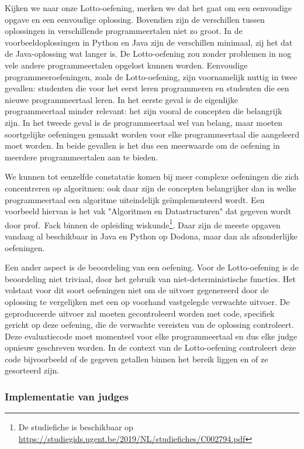 Kijken we naar onze Lotto-oefening, merken we dat het gaat om een eenvoudige opgave en een eenvoudige oplossing.
Bovendien zijn de verschillen tussen oplossingen in verschillende programmeertalen niet zo groot.
In de voorbeeldoplossingen in Python en Java zijn de verschillen minimaal, zij het dat de Java-oplossing wat langer is.
De Lotto-oefening zou zonder problemen in nog vele andere programmeertalen opgelost kunnen worden.
Eenvoudige programmeeroefeningen, zoals de Lotto-oefening, zijn voornamelijk nuttig in twee gevallen: studenten die voor het eerst leren programmeren en studenten die een nieuwe programmeertaal leren.
In het eerste geval is de eigenlijke programmeertaal minder relevant: het zijn vooral de concepten die belangrijk zijn.
In het tweede geval is de programmeertaal wel van belang, maar moeten soortgelijke oefeningen gemaakt worden voor elke programmeertaal die aangeleerd moet worden.
In beide gevallen is het dus een meerwaarde om de oefening in meerdere programmeertalen aan te bieden.

We kunnen tot eenzelfde constatatie komen bij meer complexe oefeningen die zich concentreren op algoritmen: ook daar zijn de concepten belangrijker dan in welke programmeertaal een algoritme uiteindelijk geïmplementeerd wordt.
Een voorbeeld hiervan is het vak "Algoritmen en Datastructuren" dat gegeven wordt door prof.\ Fack binnen de opleiding wiskunde\footnote{De studiefiche is beschikbaar op \url{https://studiegids.ugent.be/2019/NL/studiefiches/C002794.pdf}}.
Daar zijn de meeste opgaven vandaag al beschikbaar in Java en Python op Dodona, maar dan als afzonderlijke oefeningen.

Een ander aspect is de beoordeling van een oefening.
Voor de Lotto-oefening is de beoordeling niet triviaal, door het gebruik van niet-deterministische functies.
Het volstaat voor dit soort oefeningen niet om de uitvoer gegenereerd door de oplossing te vergelijken met een op voorhand vastgelegde verwachte uitvoer.
De geproduceerde uitvoer zal moeten gecontroleerd worden met code, specifiek gericht op deze oefening, die de verwachte vereisten van de oplossing controleert.
Deze evaluatiecode moet momenteel voor elke programmeertaal en dus elke judge opnieuw geschreven worden.
In de context van de Lotto-oefening controleert deze code bijvoorbeeld of de gegeven getallen binnen het bereik liggen en of ze gesorteerd zijn.

\subsubsection{Implementatie van judges}

